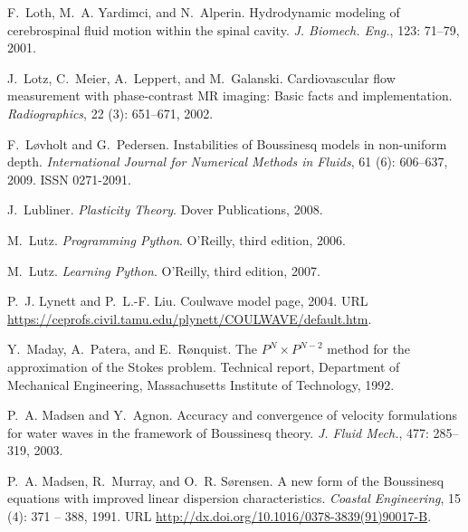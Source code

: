 \begin{thebibliography}{467}
F.~Loth, M.~A. Yardimci, and N.~Alperin.
\newblock Hydrodynamic modeling of cerebrospinal fluid motion within the spinal
  cavity.
\newblock \emph{J. Biomech. Eng.}, 123: 71--79, 2001.

J.~Lotz, C.~Meier, A.~Leppert, and M.~Galanski.
\newblock Cardiovascular flow measurement with phase-contrast {MR} imaging:
  {B}asic facts and implementation.
\newblock \emph{Radiographics}, 22 (3): 651--671, 2002.

F.~L{\o}vholt and G.~Pedersen.
\newblock Instabilities of {B}oussinesq models in non-uniform depth.
\newblock \emph{International Journal for Numerical Methods in Fluids},
  61 (6): 606--637, 2009.
\newblock ISSN 0271-2091.

J.~Lubliner.
\newblock \emph{Plasticity Theory}.
\newblock Dover Publications, 2008.

M.~Lutz.
\newblock \emph{Programming Python}.
\newblock O'Reilly, third edition, 2006.

M.~Lutz.
\newblock \emph{Learning Python}.
\newblock O'Reilly, third edition, 2007.

P.~J. Lynett and P.~L.-F. Liu.
\newblock Coulwave model page, 2004.
\newblock URL
  \url{https://ceprofs.civil.tamu.edu/plynett/COULWAVE/default.htm}.

Y.~Maday, A.~Patera, and E.~R{\o}nquist.
\newblock The {$P^N \times P^{N-2}$} method for the approximation of the
  {S}tokes problem.
\newblock Technical report, Department of Mechanical Engineering, Massachusetts
  Institute of Technology, 1992.

P.~A. Madsen and Y.~Agnon.
\newblock Accuracy and convergence of velocity formulations for water waves in
  the framework of {B}oussinesq theory.
\newblock \emph{J. Fluid Mech.}, 477: 285--319, 2003.

P.~A. Madsen, R.~Murray, and O.~R. S{\o}rensen.
\newblock A new form of the {B}oussinesq equations with improved linear
  dispersion characteristics.
\newblock \emph{Coastal Engineering}, 15 (4): 371 -- 388,
  1991.
\newblock URL \url{http://dx.doi.org/10.1016/0378-3839(91)90017-B}.


\end{thebibliography}
